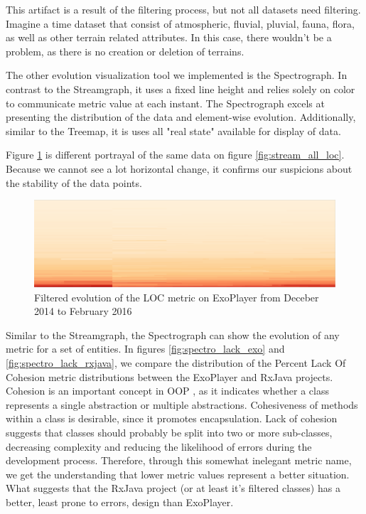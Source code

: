 This artifact is a result of the filtering process, but not all datasets need filtering. Imagine a time dataset that consist of atmospheric, fluvial, pluvial, fauna, flora, as well as other terrain related attributes. In this case, there wouldn't be a problem, as there is no creation or deletion of terrains.

The other evolution visualization tool we implemented is the Spectrograph. In contrast to the Streamgraph, it uses a fixed line height and relies solely on color to communicate metric value at each instant. The Spectrograph excels at presenting the distribution of the data and element-wise evolution. Additionally, similar to the Treemap, it is uses all "real state" available for display of data.

Figure \ref{fig:spectro_exo} is different portrayal of the same data on figure \ref{fig:stream_all_loc}. Because we cannot see a lot horizontal change, it confirms our suspicions about the stability of the data points.

\begin{figure}[H]
  \centering
  \includegraphics[width=1.0\textwidth]{figures/spectro_exo.png}
  \caption{Filtered evolution of the LOC metric on ExoPlayer from Deceber 2014 to February 2016}
  \label{fig:spectro_exo}
\end{figure}

Similar to the Streamgraph, the Spectrograph can show the evolution of any metric for a set of entities. In figures \ref{fig:spectro_lack_exo} and \ref{fig:spectro_lack_rxjava}, we compare the distribution of the Percent Lack Of Cohesion metric distributions between the ExoPlayer and RxJava projects. Cohesion is an important concept in OOP \cite{chidamber1994}, as it indicates whether a class represents a single abstraction or multiple abstractions. Cohesiveness of methods within a class is desirable, since it promotes encapsulation. Lack of cohesion suggests that classes should probably be split into two or more sub-classes, decreasing complexity and reducing the likelihood of errors during the development process. Therefore, through this somewhat inelegant metric name, we get the understanding that lower metric values represent a better situation. What suggests that the RxJava project (or at least it's filtered classes) has a better, least prone to errors, design than ExoPlayer.

